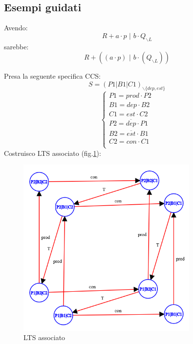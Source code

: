 \subsection{Esempi guidati}
\begin{esempio}
  Avendo:
  \[R+a\cdot p\,\,|\,\, b\cdot Q_{\backslash L}\]
  sarebbe:
  \[R+((a\cdot p)\,\,|\,\, b\cdot(Q_{\backslash L}))\]
\end{esempio}
\begin{esempio}
Presa la seguente specifica CCS:
\[S=(P1|B1|C1)_{\backslash \{dep, est\}}\]
\[
\begin{cases} 
    P1 = prod \cdot P2\\
    B1 = dep \cdot B2\\
    C1 = est \cdot C2\\
    P2 = \overline{dep} \cdot P1\\
    B2 = \overline{est} \cdot B1\\
    C2 = con \cdot C1\\
\end{cases}
\]
Costruisco LTS associato (fig.\ref{esempio1}):
\begin{figure}[H]
    \centering
    \includegraphics[width=0.8\textwidth]{img/graph.png}
    \caption{LTS associato}
    \label{esempio1}
\end{figure}
\end{esempio}
